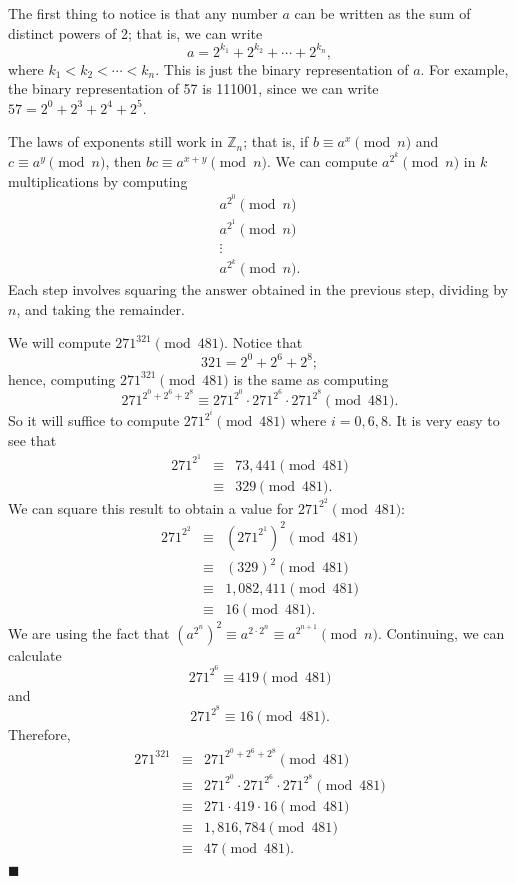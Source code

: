  
The first thing to notice is that any number $a$ can be written as the
sum of distinct powers of 2; that is, we can write
$$
a = 2^{k_1} + 2^{k_2} + \cdots + 2^{k_n},
$$
where $k_1 < k_2 < \cdots < k_n$.  This is just the binary
representation of $a$. For example, the binary representation of 57 is
111001, since we can write $57 = 2^0 + 2^3 + 2^4 + 2^5$.
 
 
The laws of exponents still work in ${\mathbb Z}_n$; that is, if $b
\equiv a^x \pmod{ n}$ and $c \equiv a^y \pmod{ n}$, then $bc \equiv
a^{x+y} \pmod{ n}$. We can compute $a^{2^k} \pmod{ n}$ in $k$
multiplications by computing 
$$
\begin{array}{c}
a^{2^0} \pmod{ n} \\
a^{2^1} \pmod{ n }\\
\vdots \\
a^{2^k} \pmod{ n}.
\end{array}
$$
Each step involves squaring the answer obtained in the previous step,
dividing by $n$, and taking the remainder.
 
 
\medskip
 
 
We will compute $271^{321} \pmod{ 481}$. Notice that
$$
321 = 2^0 +2^6 + 2^8;
$$
hence, computing $271^{ 321} \pmod{ 481}$ is the same as computing
$$
271^{ 2^0 +2^6 + 2^8 } \equiv 271^{ 2^0 } \cdot 271^{
2^6 } \cdot 271^{ 2^8 } \pmod{ 481}.
$$
So it will suffice to compute $271^{ 2^i } \pmod{ 481}$ where $i = 0,
6, 8$. It is very easy to see that 
\begin{eqnarray*}
271^{ 2^1}  & \equiv & 73,441 \pmod{ 481}  \\
& \equiv & 329 \pmod{ 481}.
\end{eqnarray*}
We can square this result to obtain a value for $271^{ 2^2} \pmod{
481}$: 
\begin{eqnarray*}
271^{ 2^2}  & \equiv & (271^{ 2^1})^2 \pmod{ 481}
\\ & \equiv & (329)^2 \pmod{ 481} \\
& \equiv & 1,082,411 \pmod{ 481} \\
& \equiv & 16 \pmod{ 481}.
\end{eqnarray*}
We are using the fact that $(a^{2^n})^2  \equiv a^{2 \cdot 2^n} \equiv
a^{ 2^{n+1} } \pmod{ n}$. Continuing, we can calculate
$$
271^{ 2^6 } \equiv 419 \pmod{ 481}
$$
and
$$
271^{ 2^8 }  \equiv 16 \pmod{ 481}.
$$
Therefore,
\begin{eqnarray*}
271^{ 321}
& \equiv & 271^{ 2^0 +2^6 + 2^8 } \pmod{ 481} \\
& \equiv & 271^{ 2^0 } \cdot 271^{ 2^6 } \cdot 271^{ 2^8 }
\pmod{ 481} \\
& \equiv & 271 \cdot 419 \cdot 16 \pmod{ 481} \\
& \equiv & 1,816,784 \pmod{ 481} \\
& \equiv & 47 \pmod{ 481}.
\end{eqnarray*}
\hspace{\fill} $\blacksquare$
 
